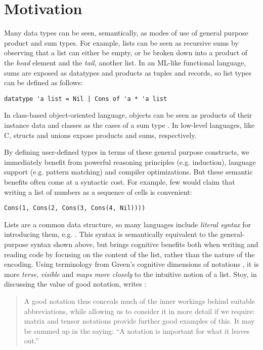 \section{Motivation}
\label{s:intro}
Many data types can be seen, semantically, as modes of use of general purpose product and sum types. 
For example, lists can be seen as recursive sums by observing that a list can either be empty, or be broken down into a product of the \emph{head} element and the \emph{tail}, another list. In an ML-like functional language, sums are exposed as datatypes and products as tuples and records, so list types can be defined as follows:
\begin{lstlisting}[numbers=none]
datatype 'a list = Nil | Cons of 'a * 'a list
\end{lstlisting}
In class-based object-oriented language, objects can be seen as products of their instance data and classes as the cases of a sum type  \cite{pfpl}. In low-level languages, like C, structs and unions expose products and sums, respectively.

By defining user-defined types in terms of these general purpose constructs, we immediately benefit from powerful reasoning principles (e.g. induction), language support (e.g.  pattern matching) and compiler optimizations. %
But these semantic benefits often come at a {syntactic} cost. For example, few would claim that writing a list of numbers as a sequence of  cells is convenient:
\begin{lstlisting}[numbers=none]
Cons(1, Cons(2, Cons(3, Cons(4, Nil))))
\end{lstlisting}

Lists are a common data structure, so many languages include \emph{literal syntax} for introducing them, e.g. \li{[1, 2, 3, 4]}. This syntax is semantically equivalent to the general-purpose syntax shown above, but brings cognitive benefits both when writing and reading code by focusing on the content of the list, rather than the nature of the encoding. Using terminology from Green's cognitive dimensions of notations \cite{green1996usability}, it is more \emph{terse}, \emph{visible} and \emph{maps more closely} to the intuitive notion of a list.
Stoy, in discussing the value of good notation, writes \cite{Stoy:1977:DSS:540155}:%
\begin{quote}A good notation thus conceals much of the inner workings behind suitable abbreviations, while allowing us to consider it in more detail if we require: matrix and tensor notations provide further good examples of this. It may be summed up in the saying: ``A notation is important for what it leaves out.''\end{quote}

